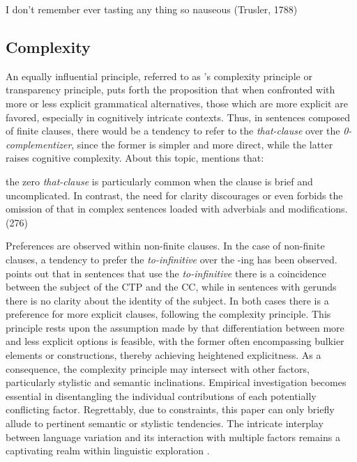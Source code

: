\documentclass[final]{clv3} %
\begin{document}
\begin{example}
I don't remember ever tasting any thing so nauseous  (Trusler, 1788)
\end{example}

\subsection{Complexity}

An equally influential principle, referred to as \citeauthor{rohdenburg1996cognitive}’s complexity principle \citeyearpar{rohdenburg1996cognitive} or transparency principle, puts forth the proposition that when confronted with more or less explicit grammatical alternatives, those which are more explicit are favored, especially in cognitively intricate contexts. Thus, in sentences composed of finite clauses, there would be a tendency to refer to the \textit{that-clause} over the \textit{0-complementizer}, since the former is simpler and more direct, while the latter raises cognitive complexity. About this topic, \citeauthor{quirk1985comprehensive} \citeyearpar{quirk1985comprehensive} mentions that:

\begin{extract}
    the zero \textit{that-clause} is particularly common when the clause is brief and uncomplicated. In contrast, the need for clarity discourages or even forbids the omission of that in complex sentences loaded with adverbials and modifications. (276)
\end{extract}

Preferences are observed within non-finite clauses. In the case of non-finite clauses, a tendency to prefer the \textit{to-infinitive} over the -ing has been observed. \citet{duffley2000gerund} points out that in sentences that use the \textit{to-infinitive} there is a coincidence between the subject of the CTP and the CC, while in sentences with gerunds there is no clarity about the identity of the subject. In both cases there is a preference for more explicit clauses, following the complexity principle. This principle rests upon the assumption made by \citet{rohdenburg1996cognitive} that differentiation between more and less explicit options is feasible, with the former often encompassing bulkier elements or constructions, thereby achieving heightened explicitness.
As a consequence, the complexity principle may intersect with other factors, particularly stylistic and semantic inclinations. Empirical investigation becomes essential in disentangling the individual contributions of each potentially conflicting factor. Regrettably, due to constraints, this paper can only briefly allude to pertinent semantic or stylistic tendencies. The intricate interplay between language variation and its interaction with multiple factors remains a captivating realm within linguistic exploration \citep{rohdenburg1996cognitive}.
\end{document}

